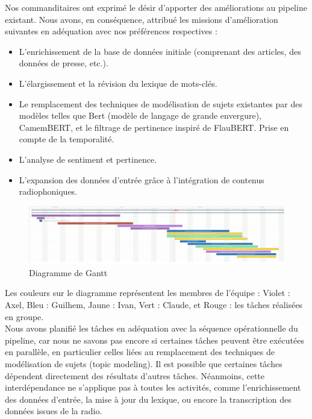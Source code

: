 \documentclass{article}
\begin{document}
Nos commanditaires ont exprimé le désir d'apporter des améliorations au pipeline existant. Nous avons, en conséquence, attribué les missions d'amélioration suivantes en adéquation avec nos préférences respectives :
\begin{itemize}
    \item L'enrichissement de la base de données initiale (comprenant des articles, des données de presse, etc.).
    \item L'élargissement et la révision du lexique de mots-clés.
    \item Le remplacement des techniques de modélisation de sujets existantes par des modèles telles que Bert (modèle de langage de grande envergure), CamemBERT, et le filtrage de pertinence inspiré de FlauBERT. Prise en compte de la temporalité. 
    \item L'analyse de sentiment et pertinence. 
    \item L'expansion des données d'entrée grâce à l'intégration de contenus radiophoniques. \\
\end{itemize}

\begin{figure}[h]
    \centering
    \includegraphics[width=1\textwidth]{gantt.png}
    \caption{Diagramme de Gantt }
    \label{fig:mon_image}
\end{figure}

Les couleurs sur le diagramme représentent les membres de l'équipe : Violet : Axel, Bleu : Guilhem, Jaune : Ivan, Vert : Claude, et Rouge : les tâches réalisées en groupe. \\

Nous avons planifié les tâches en adéquation avec la séquence opérationnelle du pipeline, car nous ne savons pas encore si certaines tâches peuvent être exécutées en parallèle, en particulier celles liées au remplacement des techniques de modélisation de sujets (topic modeling). Il est possible que certaines tâches dépendent directement des résultats d'autres tâches. Néanmoins, cette interdépendance ne s'applique pas à toutes les activités, comme l'enrichissement des données d'entrée, la mise à jour du lexique, ou encore la transcription des données issues de la radio.
\end{document}
